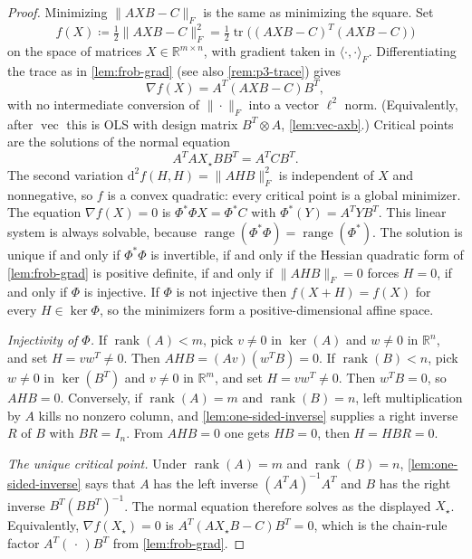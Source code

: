 \documentclass[11pt,a4paper]{article}
\DeclareMathOperator{\rank}{rank}
\begin{document}
\begin{proof}
Minimizing \(\|AXB-C\|_{F}\) is the same as minimizing the square. Set
\[
f(X)
\coloneqq
\tfrac12\|AXB-C\|_{F}^{2}
=
\tfrac12\operatorname{tr}\bigl((AXB-C)^{T}(AXB-C)\bigr)
\]
on the space of matrices \(X\in\mathbb{R}^{m\times n}\), with gradient taken in \(\langle\cdot,\cdot\rangle_{F}\). Differentiating the trace as in \cref{lem:frob-grad} (see also \cref{rem:p3-trace}) gives
\[
\nabla f(X)
=
A^{T}(AXB-C)B^{T},
\]
with no intermediate conversion of \(\|\cdot\|_{F}\) into a vector \(\ell^{2}\) norm. (Equivalently, after \(\operatorname{vec}\) this is OLS with design matrix \(B^{T}\otimes A\), \cref{lem:vec-axb}.) Critical points are the solutions of the normal equation
\[
A^{T}AX_{\star}BB^{T}
=
A^{T}CB^{T}.
\]
The second variation \(\mathrm{d}^{2}f(H,H)=\|AHB\|_{F}^{2}\) is independent of \(X\) and nonnegative, so \(f\) is a convex quadratic: every critical point is a global minimizer. The equation \(\nabla f(X)=0\) is \(\Phi^{*}\Phi X=\Phi^{*}C\) with \(\Phi^{*}(Y)=A^{T}YB^{T}\). This linear system is always solvable, because \(\operatorname{range}(\Phi^{*}\Phi)=\operatorname{range}(\Phi^{*})\). The solution is unique if and only if \(\Phi^{*}\Phi\) is invertible, if and only if the Hessian quadratic form of \cref{lem:frob-grad} is positive definite, if and only if \(\|AHB\|_{F}=0\) forces \(H=0\), if and only if \(\Phi\) is injective. If \(\Phi\) is not injective then \(f(X+H)=f(X)\) for every \(H\in\ker\Phi\), so the minimizers form a positive-dimensional affine space.

\emph{Injectivity of \(\Phi\).}
If \(\rank(A)<m\), pick \(v\neq 0\) in \(\ker(A)\) and \(w\neq 0\) in \(\mathbb{R}^{n}\), and set \(H=vw^{T}\neq 0\). Then \(AHB=(Av)(w^{T}B)=0\). If \(\rank(B)<n\), pick \(w\neq 0\) in \(\ker(B^{T})\) and \(v\neq 0\) in \(\mathbb{R}^{m}\), and set \(H=vw^{T}\neq 0\). Then \(w^{T}B=0\), so \(AHB=0\). Conversely, if \(\rank(A)=m\) and \(\rank(B)=n\), left multiplication by \(A\) kills no nonzero column, and \cref{lem:one-sided-inverse} supplies a right inverse \(R\) of \(B\) with \(BR=I_{n}\). From \(AHB=0\) one gets \(HB=0\), then \(H=HBR=0\).

\emph{The unique critical point.}
Under \(\rank(A)=m\) and \(\rank(B)=n\), \cref{lem:one-sided-inverse} says that \(A\) has the left inverse \((A^{T}A)^{-1}A^{T}\) and \(B\) has the right inverse \(B^{T}(BB^{T})^{-1}\). The normal equation therefore solves as the displayed \(X_{\star}\). Equivalently, \(\nabla f(X_{\star})=0\) is \(A^{T}(AX_{\star}B-C)B^{T}=0\), which is the chain-rule factor \(A^{T}(\,\cdot\,)B^{T}\) from \cref{lem:frob-grad}.
\end{proof}
\end{document}
